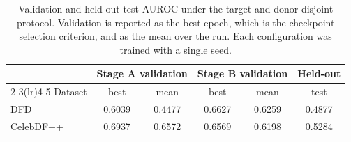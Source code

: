 \begin{table}[t]
\centering
\caption{Validation and held-out test AUROC under the target-and-donor-disjoint protocol. Validation is reported as the best epoch, which is the checkpoint selection criterion, and as the mean over the run. Each configuration was trained with a single seed.}
\label{tab:main-results}
\begin{tabular}{lccccc}
\toprule
 & \multicolumn{2}{c}{Stage A validation} & \multicolumn{2}{c}{Stage B validation} & Held-out \\
\cmidrule(lr){2-3}\cmidrule(lr){4-5}
Dataset & best & mean & best & mean & test \\
\midrule
DFD & 0.6039 & 0.4477 & 0.6627 & 0.6259 & 0.4877 \\
CelebDF++ & 0.6937 & 0.6572 & 0.6569 & 0.6198 & 0.5284 \\
\bottomrule
\end{tabular}
\end{table}
